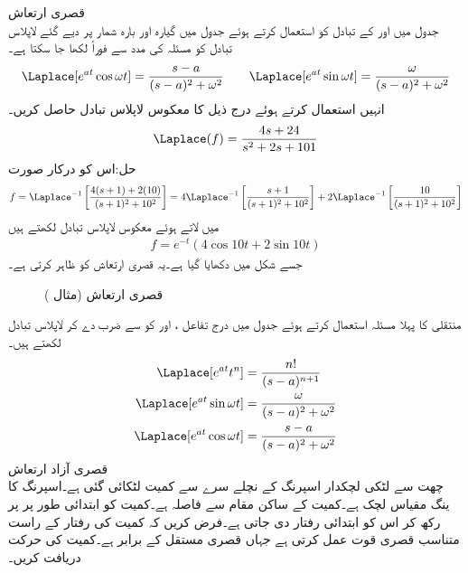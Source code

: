\quad قصری ارتعاش\\
جدول  میں  اور  کے تبادل کو استعمال کرتے ہوئے جدول میں گیارہ اور بارہ شمار پر دیے گئے لاپلاس تبادل کو مسئلہ  کی مدد سے فوراً لکھا جا سکتا ہے۔
\begin{align*}
\Laplace[e^{at}\cos \omega t]=\frac{s-a}{(s-a)^2+\omega^2} \quad \quad \Laplace[e^{at}\sin \omega t]=\frac{\omega}{(s-a)^2+\omega^2}
\end{align*}
انہیں استعمال کرتے ہوئے درج ذیل کا معکوس لاپلاس تبادل حاصل کریں۔
\begin{align*}
\Laplace(f)=\frac{4s+24}{s^2+2s+101}
\end{align*}
حل:اس کو درکار صورت
\begin{align*}
f=\Laplace^{-1}\left[\frac{4(s+1)+2(10)}{(s+1)^2+10^2}\right]=4\Laplace^{-1}\left[\frac{s+1}{(s+1)^2+10^2}\right]+2\Laplace^{-1}\left[\frac{10}{(s+1)^2+10^2}\right]
\end{align*}
 میں لاتے ہوئے معکوس لاپلاس تبادل لکھتے ہیں
\begin{align*}
f=e^{-t}(4\cos 10t+2\sin 10t)
\end{align*}
 جسے شکل  میں دکھایا گیا ہے۔یہ قصری ارتعاش کو ظاہر کرتی ہے۔
\begin{figure}
\centering
{}
\caption{قصری ارتعاش (مثال )}
\label{شکل_لاپلاس_قصری_ارتعاش}
\end{figure}
منتقلی کا پہلا مسئلہ استعمال کرتے ہوئے جدول  میں درج  تفاعل ،  اور  کو  سے ضرب دے کر لاپلاس تبادل لکھتے ہیں۔
\begin{align*}
\Laplace[e^{at}t^n]&=\frac{n!}{(s-a)^{n+1}}\\
\Laplace[e^{at}\sin \omega t]&=\frac{\omega}{(s-a)^2+\omega^2}\\
\Laplace[e^{at}\cos \omega t]&=\frac{s-a}{(s-a)^2+\omega^2}
\end{align*} 
\quad قصری آزاد ارتعاش\\
چھت سے لٹکی  لچکدار اسپرنگ کے نچلے سرے سے کمیت  لٹکائی گئی ہے۔اسپرنگ کا ینگ مقیاس لچک  ہے۔کمیت کے ساکن مقام سے فاصلہ   ہے۔کمیت کو ابتدائی طور پر  پر رکھ کر اس کو ابتدائی رفتار  دی جاتی ہے۔فرض کریں کہ کمیت کی رفتار کے راست متناسب قصری قوت عمل کرتی ہے جہاں قصری مستقل  کے برابر ہے۔کمیت کی حرکت دریافت کریں۔

